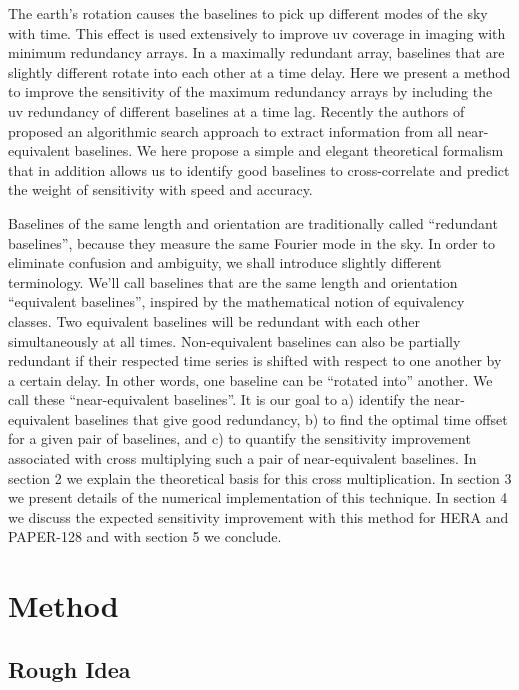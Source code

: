 \documentclass[preprint2,numberedappendix,tighten,twocolappendix]{aastex6}  %
\renewcommand\[{\begin{equation}}
\renewcommand\]{\end{equation}}
\begin{document}
The earth's rotation causes the baselines to pick up different modes of the sky with time. 
This effect is used extensively to improve uv coverage in imaging with minimum redundancy arrays. In
a maximally redundant array, baselines that are slightly different
rotate into each other at a time delay. Here we present a method to
improve the sensitivity of the maximum redundancy arrays by including
the uv redundancy of different baselines at a time lag. Recently the authors of \cite{wterm} proposed an algorithmic search approach to extract information from all near-equivalent baselines. We here propose a simple and elegant theoretical formalism that in addition allows us to identify good baselines to cross-correlate and predict the weight of sensitivity with speed and accuracy. 

Baselines of the same length and orientation are traditionally called
``redundant baselines'', because they measure the same Fourier mode
in the sky. In order to eliminate confusion and ambiguity, we shall
introduce slightly different terminology. We'll call baselines that
are the same length and orientation ``equivalent baselines'', inspired
by the mathematical notion of equivalency classes. Two equivalent
baselines will be redundant with each other simultaneously at all
times. Non-equivalent baselines can also be partially redundant if their
respected time series is shifted with respect to one another by a
certain delay. In other words, one baseline can be ``rotated into''
another. We call these ``near-equivalent baselines''. It is our
goal to a) identify the near-equivalent baselines that give good
redundancy, b) to find the optimal time offset for a given pair of baselines, and
c) to quantify the sensitivity improvement associated with cross multiplying
such a pair of near-equivalent baselines. In section
2 we explain the theoretical basis for this cross multiplication.
In section 3 we present details of the numerical implementation of
this technique. In section 4 we discuss the expected sensitivity improvement
with this method for HERA and PAPER-128 and with section 5 we conclude. 


\section{Method}

\subsection{Rough Idea}
\end{document}
